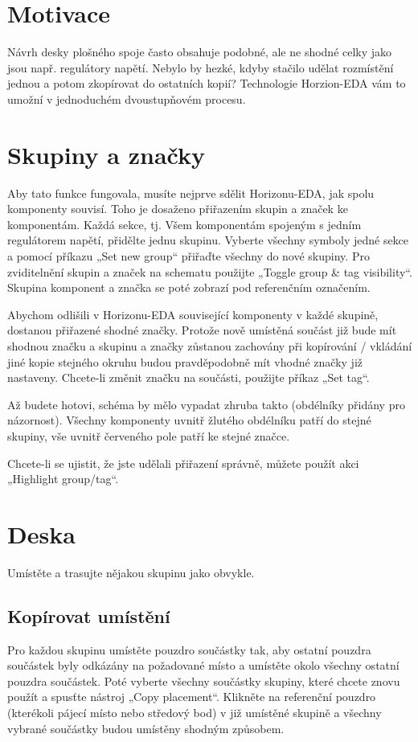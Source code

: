 \documentclass[letterpaper,10pt,czech]{sphinxmanual}
\begin{document}
\section{Motivace}
\label{\detokenize{copy-layout-placement:motivace}}
Návrh desky plošného spoje často obsahuje podobné, ale ne shodné celky jako jsou např. regulátory napětí. Nebylo by hezké, kdyby stačilo udělat rozmístění jednou a potom zkopírovat do ostatních kopií? Technologie Horzion-EDA vám to umožní v jednoduchém dvoustupňovém procesu.


\section{Skupiny a značky}
\label{\detokenize{copy-layout-placement:skupiny-a-znacky}}
Aby tato funkce fungovala, musíte nejprve sdělit Horizonu-EDA, jak spolu komponenty souvisí. Toho je dosaženo přiřazením skupin a značek ke komponentám. Každá sekce, tj. Všem komponentám spojeným s
jedním regulátorem napětí, přidělte jednu skupinu. Vyberte všechny symboly jedné sekce a pomocí příkazu „Set new group“ přiřaďte všechny do nové skupiny. Pro zviditelnění skupin a značek na schematu použijte „Toggle group \& tag visibility“. Skupina komponent a značka se poté zobrazí pod referenčním označením.

Abychom odlišili v Horizonu-EDA související komponenty v každé skupině, dostanou přiřazené shodné značky. Protože nově umístěná součást již bude mít shodnou značku a skupinu a značky zůstanou zachovány při kopírování / vkládání jiné kopie stejného okruhu budou pravděpodobně mít vhodné značky již nastaveny. Chcete-li změnit značku na součásti, použijte příkaz „Set tag“.

Až budete hotovi, schéma by mělo vypadat zhruba takto (obdélníky přidány pro názornost). Všechny komponenty uvnitř žlutého obdélníku patří do stejné skupiny, vše uvnitř červeného pole patří ke stejné značce.

\noindent{}

Chcete-li se ujistit, že jste udělali přiřazení správně, můžete použít akci „Highlight group/tag“.


\section{Deska}
\label{\detokenize{copy-layout-placement:deska}}
Umístěte a trasujte nějakou skupinu jako obvykle.


\subsection{Kopírovat umístění}
\label{\detokenize{copy-layout-placement:kopirovat-umisteni}}
Pro každou skupinu umístěte pouzdro součástky tak, aby ostatní pouzdra součástek byly odkázány na požadované místo a umístěte okolo všechny ostatní pouzdra součástek. Poté vyberte všechny součástky skupiny, které chcete znovu použít a spusťte nástroj „Copy placement“. Klikněte na referenční pouzdro (kterékoli pájecí místo nebo středový bod) v již umístěné skupině a všechny vybrané součástky budou umístěny shodným způsobem.
\end{document}
